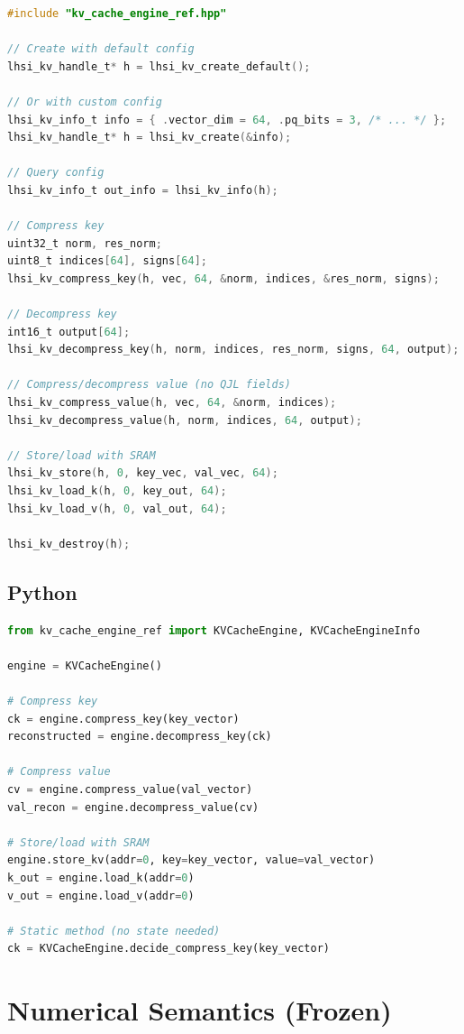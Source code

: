 \documentclass[11pt]{article}
\begin{document}
\begin{lstlisting}[language=C]
#include "kv_cache_engine_ref.hpp"

// Create with default config
lhsi_kv_handle_t* h = lhsi_kv_create_default();

// Or with custom config
lhsi_kv_info_t info = { .vector_dim = 64, .pq_bits = 3, /* ... */ };
lhsi_kv_handle_t* h = lhsi_kv_create(&info);

// Query config
lhsi_kv_info_t out_info = lhsi_kv_info(h);

// Compress key
uint32_t norm, res_norm;
uint8_t indices[64], signs[64];
lhsi_kv_compress_key(h, vec, 64, &norm, indices, &res_norm, signs);

// Decompress key
int16_t output[64];
lhsi_kv_decompress_key(h, norm, indices, res_norm, signs, 64, output);

// Compress/decompress value (no QJL fields)
lhsi_kv_compress_value(h, vec, 64, &norm, indices);
lhsi_kv_decompress_value(h, norm, indices, 64, output);

// Store/load with SRAM
lhsi_kv_store(h, 0, key_vec, val_vec, 64);
lhsi_kv_load_k(h, 0, key_out, 64);
lhsi_kv_load_v(h, 0, val_out, 64);

lhsi_kv_destroy(h);
\end{lstlisting}

\subsection{Python}

\begin{lstlisting}[language=Python]
from kv_cache_engine_ref import KVCacheEngine, KVCacheEngineInfo

engine = KVCacheEngine()

# Compress key
ck = engine.compress_key(key_vector)
reconstructed = engine.decompress_key(ck)

# Compress value
cv = engine.compress_value(val_vector)
val_recon = engine.decompress_value(cv)

# Store/load with SRAM
engine.store_kv(addr=0, key=key_vector, value=val_vector)
k_out = engine.load_k(addr=0)
v_out = engine.load_v(addr=0)

# Static method (no state needed)
ck = KVCacheEngine.decide_compress_key(key_vector)
\end{lstlisting}

\section{Numerical Semantics (Frozen)}
\label{sec:semantics}
\end{document}
